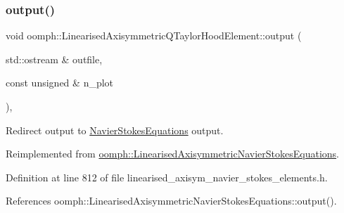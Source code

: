 \mbox{\label{classoomph_1_1LinearisedAxisymmetricQTaylorHoodElement_a7d3a4a80bfc52257b5c9b5af6ed18f72}} 
\subsubsection{\texorpdfstring{output()}{output()}\hspace{0.1cm}{\footnotesize\ttfamily [2/4]}}
{\footnotesize\ttfamily void oomph\+::\+Linearised\+Axisymmetric\+Q\+Taylor\+Hood\+Element\+::output (\begin{DoxyParamCaption}\item[{std\+::ostream \&}]{outfile,  }\item[{const unsigned \&}]{n\+\_\+plot }\end{DoxyParamCaption})\hspace{0.3cm}{\ttfamily [inline]}, {\ttfamily [virtual]}}



Redirect output to \hyperlink{classoomph_1_1NavierStokesEquations}{Navier\+Stokes\+Equations} output. 



Reimplemented from \hyperlink{classoomph_1_1LinearisedAxisymmetricNavierStokesEquations_af91220377d90bc7506327e4f1de9e42a}{oomph\+::\+Linearised\+Axisymmetric\+Navier\+Stokes\+Equations}.



Definition at line 812 of file linearised\+\_\+axisym\+\_\+navier\+\_\+stokes\+\_\+elements.\+h.



References oomph\+::\+Linearised\+Axisymmetric\+Navier\+Stokes\+Equations\+::output().

\mbox{\label{classoomph_1_1LinearisedAxisymmetricQTaylorHoodElement_ae6f718cf66bb753eccb3393c03ecfc4f}} 
